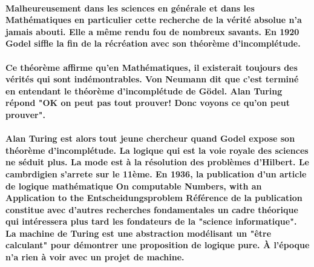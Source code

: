 \documentclass[a4paper, 11pt]{book}
\begin{document}
\paragraph{
  Malheureusement dans les sciences en générale et dans les Mathématiques en particulier cette recherche de la vérité absolue n'a jamais abouti. Elle a même rendu fou de nombreux savants. En 1920 Godel siffle la fin de la récréation avec son théorème d'incomplétude.
}


\paragraph{
  Ce théorème affirme qu'en Mathématiques, il existerait toujours des vérités qui sont indémontrables. Von Neumann dit que c'est terminé en entendant le théorème d'incomplétude de Gödel. Alan Turing répond "OK on peut pas tout prouver! Donc voyons ce qu'on peut prouver".
}


\paragraph{Alan Turing est alors tout jeune chercheur quand Godel expose son théorème d'incomplétude. La logique qui est la voie royale des sciences ne séduit plus. La mode est à la résolution des problèmes d'Hilbert. Le cambrdigien s'arrete sur le 11ème. En 1936, la publication d'un article de logique mathématique On computable Numbers, with an Application to the Entscheidungsproblem Référence de la publication constitue avec d'autres recherches fondamentales un cadre théorique qui intéressera plus tard les fondateurs de la "science informatique". La machine de Turing est une abstraction modélisant un "être calculant" pour démontrer une proposition de logique pure. À l'époque n'a rien à voir avec un projet de machine.}

\end{document}
